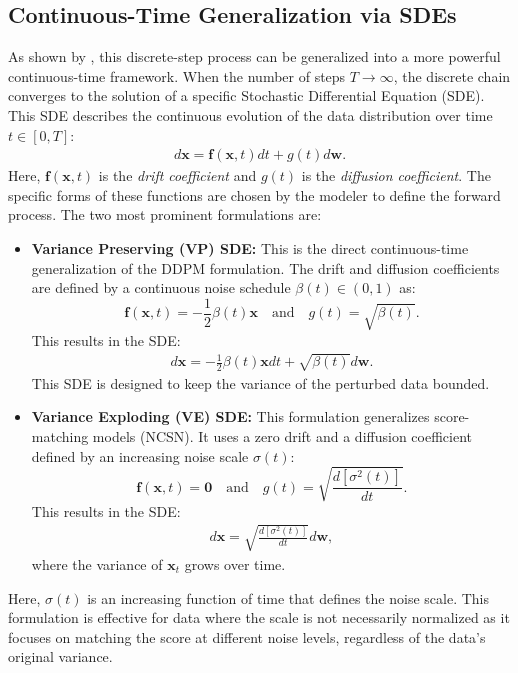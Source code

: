 \documentclass{article}
\newcommand{\eqlnostar}[2]{\begin{align}\label{#1}#2\end{align}}
\begin{document}
\subsection{Continuous-Time Generalization via SDEs}

As shown by \citet{DBLP:journals/corr/abs-2011-13456}, this discrete-step process can be generalized into a more powerful continuous-time framework. When the number of steps $T \to \infty$, the discrete chain converges to the solution of a specific Stochastic Differential Equation (SDE). This SDE describes the continuous evolution of the data distribution over time $t \in [0, T]$:
\eqlnostar{eq:forward process}{
d\mathbf{x} = \mathbf{f}(\mathbf{x}, t)dt + g(t)d\mathbf{w}.}
Here, $\mathbf{f}(\mathbf{x}, t)$ is the \textit{drift coefficient} and $g(t)$ is the \textit{diffusion coefficient}. The specific forms of these functions are chosen by the modeler to define the forward process. The two most prominent formulations are:

\begin{itemize}
    \item \textbf{Variance Preserving (VP) SDE:} This is the direct continuous-time generalization of the DDPM formulation. The drift and diffusion coefficients are defined by a continuous noise schedule $\beta(t) \in (0, 1)$ as:
    $$
    \mathbf{f}(\mathbf{x}, t) = -\frac{1}{2}\beta(t)\mathbf{x} \quad \text{and} \quad g(t) = \sqrt{\beta(t)}.
    $$
    This results in the SDE:
    \eqlnostar{eq:vp sde}{
    d\mathbf{x} = -\frac{1}{2}\beta(t)\mathbf{x} dt + \sqrt{\beta(t)}d\mathbf{w}.}
    This SDE is designed to keep the variance of the perturbed data bounded.

    \item \textbf{Variance Exploding (VE) SDE:} This formulation generalizes score-matching models (NCSN). It uses a zero drift and a diffusion coefficient defined by an increasing noise scale $\sigma(t)$:
    $$
    \mathbf{f}(\mathbf{x}, t) = \mathbf{0} \quad \text{and} \quad g(t) = \sqrt{\frac{d[\sigma^2(t)]}{dt}}.
    $$
    This results in the SDE:
    \eqlnostar{eq:ve sde}{
    d\mathbf{x} = \sqrt{\frac{d[\sigma^2(t)]}{dt}}d\mathbf{w},
    }
    where the variance of $\mathbf{x}_t$ grows over time.
\end{itemize}
Here, $\sigma(t)$ is an increasing function of time that defines the noise scale. This formulation is effective for data where the scale is not necessarily normalized as it focuses on matching the score at different noise levels, regardless of the data's original variance.
\end{document}

